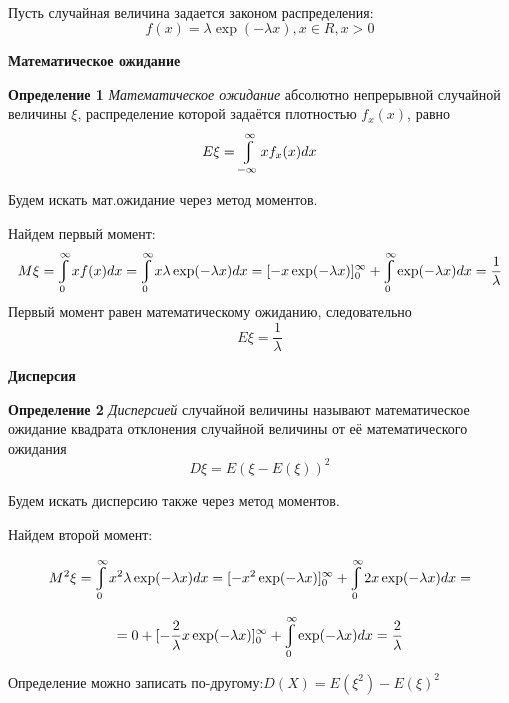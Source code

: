 \documentclass[a4paper,12pt, oneside]{book}
\let\int\varint
\begin{document}
\\
\vspace{5mm}

	Пусть случайная величина задается законом распределения:
	$$
	f(x) = \lambda \exp(-\lambda x), x \in R, x > 0
	$$
	
	
	
	
	\vspace{5mm}
	\large{\textbf{Математическое ожидание}}
	\vspace{5mm}
	
	\normalsize{\textbf{Определение 1}} \textit{ Математическое ожидание} абсолютно непрерывной случайной величины $\xi$, распределение которой задаётся плотностью $f_x(x)$, равно
	$$
	E\xi = \int\limits_{-\infty}^{\infty} x f_x(x)dx
	$$
	
	Будем искать мат.ожидание через метод моментов.
	
	\vspace{\baselineskip}
	Найдем первый момент:
	$$
	M\xi = \int_0^\infty x f(x) dx = \int_0^\infty x \lambda \exp(-\lambda x)dx = [- x \exp(- \lambda x)]_0^\infty + \int_0^\infty \exp(-\lambda x) dx = \frac{1}{\lambda}
	$$
	Первый момент равен математическому  ожиданию, следовательно 
	$$
	 E\xi = \frac{1}{\lambda}
	$$	
	
	\vspace{5mm}
	\large{\textbf{Дисперсия}}
	\vspace{5mm}
	
	\normalsize{\textbf{Определение 2}} \textit{ Дисперсией } случайной величины называют математическое ожидание квадрата отклонения случайной величины от её математического ожидания
	$$
	D\xi = E(\xi - E(\xi))^2
	$$
	
	\vspace{\baselineskip}
	Будем искать дисперсию также через метод моментов.
	
	Найдем второй момент:
	
	$$
	M^2\xi = \int_0^\infty x^2 \lambda \exp(-\lambda x) dx = [-x^2 \exp(-\lambda x)]_0^\infty +\int_0^\infty 2 x \exp(-\lambda x)dx =
	$$ 
	
	$$
	= 0 + [-\frac{2}{\lambda} x \exp(-\lambda x)]_0^\infty + \int_0^\infty \exp(-\lambda x)dx = \frac{2}{\lambda}
	$$
	
	\vspace{\baselineskip}
	Определение можно записать по-другому:$D(X) = E(\xi^2) - E(\xi)^2$\\
	
\end{document}
